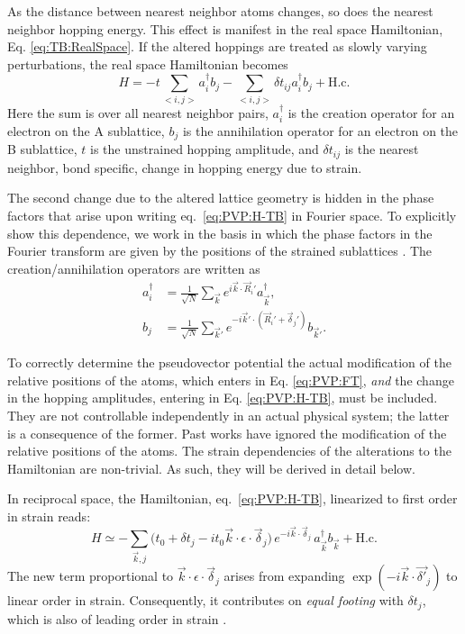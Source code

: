 As the distance between nearest neighbor atoms changes, so does the nearest neighbor hopping energy.
This effect is manifest in the real space Hamiltonian, Eq. \ref{eq:TB:RealSpace}. 
If the altered hoppings are treated as slowly varying perturbations\cite{CastroNeto2009}, the real space Hamiltonian becomes
\begin{equation}
  H = - t \sum_{<i,j>}a_i^{\dagger}b_j
    - \sum_{<i,j>} \delta t_{ij} a_i^{\dagger}b_j
    + \text{H.c.}
  \label{eq:PVP:H-TB}
\end{equation}
Here the sum is over all nearest neighbor pairs, $a_i^{\dagger}$ is the creation operator for an electron on the A sublattice, $b_j$ is the annihilation operator for an electron on the B sublattice, $t$ is the unstrained hopping amplitude, and $\delta t_{ij}$ is the nearest neighbor, bond specific, change in hopping energy due to strain. 

The second change due to the altered lattice geometry is hidden in the phase factors that arise upon writing eq.~\ref{eq:PVP:H-TB} in Fourier space.
To explicitly show this dependence, we work in the basis in which the phase factors in the Fourier transform are given by the positions of the strained sublattices \cite{Bena2009}.
The creation/annihilation operators are written as
\begin{align}
	a_i^{\dagger}&=\frac{1}{\sqrt{N}}\sum_{\vec{k}}e^{i \vec{k}\cdot\vec{R}_i'}a_{\vec{k}}^{\dagger}, \\ 
	b_j&=\frac{1}{\sqrt{N}}\sum_{\vec{k}'}e^{-i \vec{k}'\cdot(\vec{R}_i'+\vec{\delta}_j')}b_{\vec{k}'}.
	\label{eq:PVP:FT}
\end{align}

To correctly determine the pseudovector potential the actual modification of the relative positions of the atoms, which enters in Eq. \ref{eq:PVP:FT}, \emph{and} the change in the hopping amplitudes, entering in Eq. \ref{eq:PVP:H-TB}, must be included.
They are not controllable independently in an actual physical system; the latter is a consequence of the former.
Past works have ignored the modification of the relative positions of the atoms.
The strain dependencies of the alterations to the Hamiltonian are non-trivial.
As such, they will be derived in detail below.






In reciprocal space, the Hamiltonian, eq.~\ref{eq:PVP:H-TB}, linearized to first order in strain reads:
\begin{equation}
  H \simeq -\sum_{\vec{k},j} \bigl(
  t_0 + \delta t_j - it_0\vec{k}\cdot\epsilon\cdot\vec{\delta}_j
  \bigr) \, e^{-i\vec{k}\cdot\vec{\delta}_j} \,
  a_{\vec{k}}^{\dagger}b_{\vec{k}} + \text{H.c.}
  \label{eq:H-TB-strain}
\end{equation}
The new term proportional to $\vec{k}\cdot\epsilon\cdot\vec{\delta}_j$ arises from expanding $\exp(-i\vec{k}\cdot\vec{\delta'}_j)$ to linear order in strain. Consequently, it contributes on \emph{equal footing} with $\delta t_j$, which is also of leading order in strain \cite{CastroNeto2009}.

